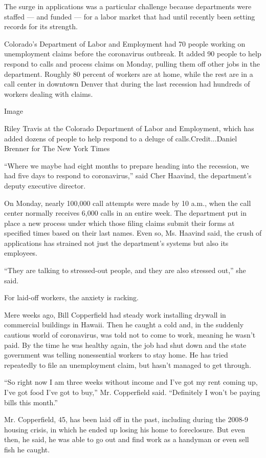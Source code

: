 The surge in applications was a particular challenge because departments
were staffed --- and funded --- for a labor market that had until
recently been setting records for its strength.

Colorado's Department of Labor and Employment had 70 people working on
unemployment claims before the coronavirus outbreak. It added 90 people
to help respond to calls and process claims on Monday, pulling them off
other jobs in the department. Roughly 80 percent of workers are at home,
while the rest are in a call center in downtown Denver that during the
last recession had hundreds of workers dealing with claims.

Image

Riley Travis at the Colorado Department of Labor and Employment, which
has added dozens of people to help respond to a deluge of
calls.Credit...Daniel Brenner for The New York Times

``Where we maybe had eight months to prepare heading into the recession,
we had five days to respond to coronavirus,'' said Cher Haavind, the
department's deputy executive director.

On Monday, nearly 100,000 call attempts were made by 10 a.m., when the
call center normally receives 6,000 calls in an entire week. The
department put in place a new process under which those filing claims
submit their forms at specified times based on their last names. Even
so, Ms. Haavind said, the crush of applications has strained not just
the department's systems but also its employees.

``They are talking to stressed-out people, and they are also stressed
out,'' she said.

For laid-off workers, the anxiety is racking.

Mere weeks ago, Bill Copperfield had steady work installing drywall in
commercial buildings in Hawaii. Then he caught a cold and, in the
suddenly cautious world of coronavirus, was told not to come to work,
meaning he wasn't paid. By the time he was healthy again, the job had
shut down and the state government was telling nonessential workers to
stay home. He has tried repeatedly to file an unemployment claim, but
hasn't managed to get through.

``So right now I am three weeks without income and I've got my rent
coming up, I've got food I've got to buy,'' Mr. Copperfield said.
``Definitely I won't be paying bills this month.''

Mr. Copperfield, 45, has been laid off in the past, including during the
2008-9 housing crisis, in which he ended up losing his home to
foreclosure. But even then, he said, he was able to go out and find work
as a handyman or even sell fish he caught.

